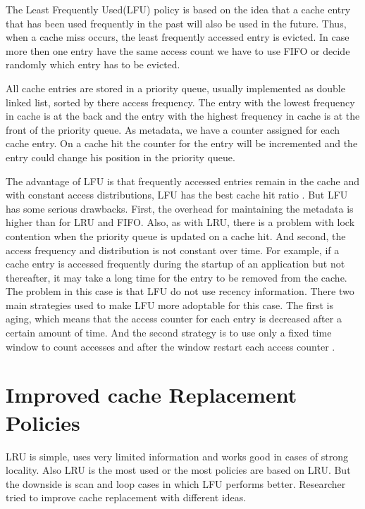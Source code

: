 \documentclass[
	12pt,
	a4paper,
	abstract,
	bibliography=totoc,
	chapterprefix,
	headings=openright,
	numbers=endperiod,
	parskip=half,
	twoside,
]{scrreprt}
\begin{document}
The Least Frequently Used(LFU) policy is based on the idea that a cache entry that has been used frequently in the past will also be used in the future.
Thus, when a cache miss occurs, the least frequently accessed entry is evicted.
In case more then one entry have the same access count we have to use FIFO or decide randomly which entry has to be evicted.

All cache entries are stored in a priority queue, usually implemented as double linked list, sorted by there access frequency.
The entry with the lowest frequency in cache is at the back and the entry with the highest frequency in cache is at the front of the priority queue.
As metadata, we have a counter assigned for each cache entry.
On a cache hit the counter for the entry will be incremented and the entry could change his position in the priority queue.

The advantage of LFU is that frequently accessed entries remain in the cache and with constant
access distributions, LFU has the best cache hit ratio \cite{some2017tinylfu}.
But LFU has some  serious drawbacks.
First, the overhead for maintaining the metadata is higher than for LRU and FIFO.
Also, as with LRU, there is a problem with lock contention when the priority queue is updated on a cache hit.
And second, the access frequency and distribution is not constant over time.
For example, if a cache entry is accessed frequently during the startup of an application but not thereafter, it may take a long time for the entry to be removed from the cache.
The problem in this case is that LFU do not use recency information.
There two main strategies used to make LFU more adoptable for this case.
The first is aging, which means that the access counter for each entry is decreased after  a certain amount of time.
And the second strategy is to use only a fixed time window to count accesses and after the window restart each access counter \cite{karakostas2000practical}.

\section{Improved cache Replacement Policies}
LRU is simple, uses very limited information and works good in cases of strong locality.
Also LRU is the most used or the most policies are based on LRU.
But the downside is scan and loop cases in which LFU performs better.
Researcher tried to improve cache replacement with different ideas.
\end{document}
